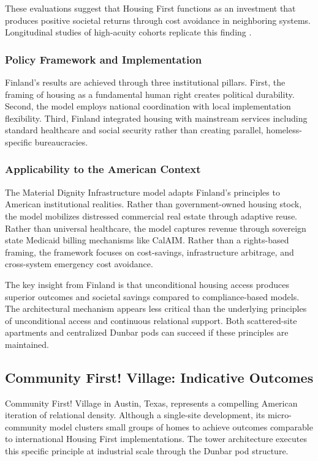 \documentclass[12pt, letterpaper]{article}
\begin{document}
These evaluations suggest that Housing First functions as an investment that produces positive societal returns through cost avoidance in neighboring systems. Longitudinal studies of high-acuity cohorts replicate this finding \citep{larimer_2009}.

\subsubsection{Policy Framework and Implementation}

Finland's results are achieved through three institutional pillars. First, the framing of housing as a fundamental human right creates political durability. Second, the model employs national coordination with local implementation flexibility. Third, Finland integrated housing with mainstream services including standard healthcare and social security rather than creating parallel, homeless-specific bureaucracies.

\subsubsection{Applicability to the American Context}

The Material Dignity Infrastructure model adapts Finland's principles to American institutional realities. Rather than government-owned housing stock, the model mobilizes distressed commercial real estate through adaptive reuse. Rather than universal healthcare, the model captures revenue through sovereign state Medicaid billing mechanisms like CalAIM. Rather than a rights-based framing, the framework focuses on cost-savings, infrastructure arbitrage, and cross-system emergency cost avoidance.

The key insight from Finland is that unconditional housing access produces superior outcomes and societal savings compared to compliance-based models. The architectural mechanism appears less critical than the underlying principles of unconditional access and continuous relational support. Both scattered-site apartments and centralized Dunbar pods can succeed if these principles are maintained.

\subsection{Community First! Village: Indicative Outcomes}

Community First! Village in Austin, Texas, represents a compelling American iteration of relational density. Although a single-site development, its micro-community model clusters small groups of homes to achieve outcomes comparable to international Housing First implementations. The tower architecture executes this specific principle at industrial scale through the Dunbar pod structure.
\end{document}

